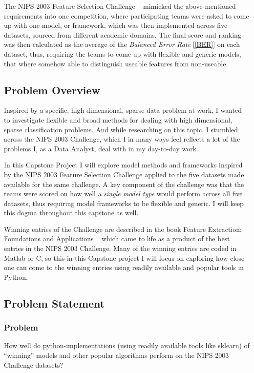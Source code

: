 \documentclass[12pt]{article}
\begin{document}
The NIPS 2003 Feature Selection Challenge ~\cite{nips03workshop} mimicked the above-mentioned requirements into one competition, where participating teams were asked to come up with one model, or framework, which was then implemented across five datasets, sourced from different academic domains. The final score and ranking was then calculated as the average of the \emph{Balanced Error Rate} [\ref{BER}] on each dataset, thus, requiring the teams to come up with flexible and generic models, that where somehow able to distinguish useable features from non-useable.

\subsection{Problem Overview}

Inspired by a specific, high dimensional, sparse data problem at work, I wanted to investigate flexible and broad methods for dealing with high dimensional, sparse classification problems. And while researching on this topic, I stumbled across the NIPS 2003 Challenge, which I in many ways feel reflects a lot of the problems I, as a Data Analyst, deal with in my day-to-day work.

In this Capstone Project I will explore model methods and frameworks inspired by the NIPS 2003 Feature Selection Challenge applied to the five datasets made available for the same challenge. A key component of the challenge was that the teams were scored on how well a \emph{single model type} would perform across all five datasets, thus requiring model frameworks to be flexible and generic. I will keep this dogma throughout this capstone as well.

Winning entries of the Challenge are described in the book Feature Extraction: Foundations and Applications ~\cite{nips03book} which came to life as a product of the best entries in the NIPS 2003 Challenge. Many of the winning entries are coded in Matlab or C, so this in this Capstone project I will focus on exploring how close one can come to the winning entries using readily available and popular tools in Python.


\subsection{Problem Statement}

\subsubsection{Problem}
How well do python-implementations (using readily available tools like sklearn) of “winning” models and other popular algorithms perform on the NIPS 2003 Challenge datasets?
\end{document}
